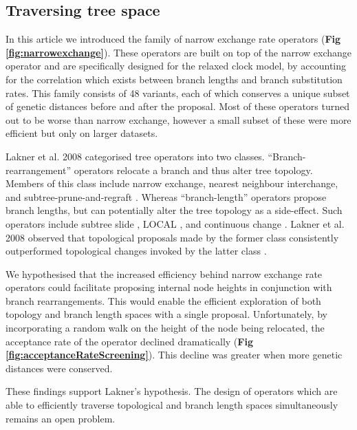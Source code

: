 \documentclass[10pt,letterpaper]{article}
\begin{document}
	

\subsection*{Traversing tree space}


In this article we introduced the family of narrow exchange rate operators (\textbf{Fig \ref{fig:narrowexchange}}).
These operators are built on top of the narrow exchange operator and are specifically designed for the relaxed clock model, by accounting for the correlation which exists between branch lengths and branch substitution rates. 
This family consists of 48 variants, each of which conserves a unique subset of genetic distances before and after the proposal. 
Most of these operators turned out to be worse than narrow exchange, however a small subset of these were more efficient but only on larger datasets.  


Lakner et al. 2008 categorised tree operators into two classes.
``Branch-rearrangement'' operators relocate a branch and thus alter tree topology. 
Members of this class include narrow exchange, nearest neighbour interchange, and subtree-prune-and-regraft \cite{semple2003phylogenetics}.
Whereas ``branch-length'' operators propose branch lengths, but can potentially alter the tree topology as a side-effect.
 Such operators include subtree slide \cite{hohna2008clock}, LOCAL \cite{simon1998local}, and continuous change \cite{jow2002bayesian}.
Lakner et al. 2008 observed that topological proposals made by the former class consistently outperformed topological changes invoked by the latter class \cite{lakner2008efficiency}.




We hypothesised that the increased efficiency behind narrow exchange rate operators could facilitate proposing internal node heights in conjunction with branch rearrangements.
This would enable the efficient exploration of both topology and branch length spaces with a single proposal.
Unfortunately, by incorporating a random walk on the height of the node being relocated, the acceptance rate of the operator declined dramatically  (\textbf{Fig \ref{fig:acceptanceRateScreening}}). 
This decline was greater when more genetic distances were conserved.


These findings support Lakner's hypothesis.
The design of operators which are able to efficiently traverse topological and branch length spaces simultaneously remains an open problem.
\end{document}
